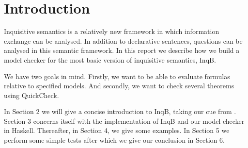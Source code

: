 \section{Introduction}\label{sec: Introduction}
Inquisitive semantics is a relatively new framework in which information exchange can be analysed. In addition to declarative sentences, questions can be analysed in this semantic framework. In this report we describe how we build a model checker for the most basic version of inquisitive semantics, \textsf{InqB}.

We have two goals in mind. Firstly, we want to be able to evaluate formulas relative to specified models. And secondly, we want to check several theorems using QuickCheck.

In Section 2 we will give a concise introduction to \textsf{InqB}, taking our cue from \cite{inquisitive19}. Section 3 concerns itself with the implementation of \textsf{InqB} and our model checker in Haskell. Thereafter, in Section 4, we give some examples. In Section 5 we perform some simple tests after which we give our conclusion in Section 6.

